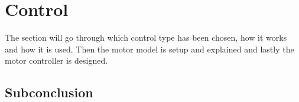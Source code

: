 \section{Control}
\label{sec:control}

The section will go through which control type has been chosen, how it works and how it is used. Then the motor model is setup and explained and lastly the motor controller is designed.













\subsection*{Subconclusion}
